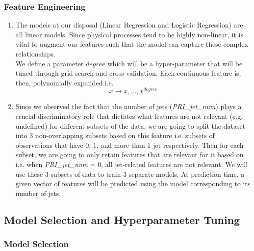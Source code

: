 \documentclass[10pt,conference,compsocconf]{IEEEtran}
\begin{document}
\subsubsection{Feature Engineering}
\begin{enumerate}
    \item The models at our disposal (Linear Regression and Logistic Regression) are all linear models. Since physical processes tend to be highly non-linear, it is vital to augment our features such that the model can capture these complex relationships.
\\

    We define a parameter $\textit{degree}$ which will be a hyper-parameter that will be tuned through grid search and cross-validation. Each continuous feature is, then, polynomially expanded i.e. \begin{equation} x \rightarrow x, ..., x^{\textit{degree}}
    \end{equation} 
    \item Since we observed the fact that the number of jets (\textit{PRI\_jet\_num}) plays a crucial discriminatory role that dictates what features are not relevant (e.g. undefined) for different subsets of the data, we are going to split the dataset into 3 non-overlapping subsets based on this feature i.e. subsets of observations that have 0, 1, and more than 1 jet respectively. Then for each subset, we are going to only retain features that are relevant for it based on \cite{dataset_paper} i.e. when \textit{PRI\_jet\_num} = 0, all jet-related features are not relevant. We will use these 3 subsets of data to train 3 separate models. At prediction time, a given vector of features will be predicted using the model corresponding to its number of jets.
\end{enumerate}


\subsection{Model Selection and Hyperparameter Tuning}

\subsubsection{Model Selection}
\end{document}
